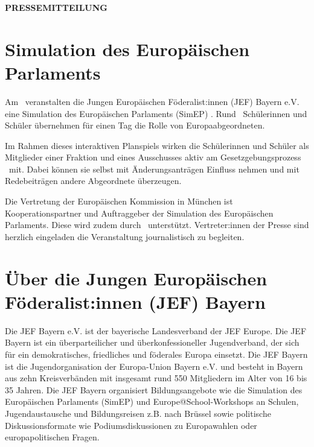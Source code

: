 \documentclass[11pt]{article}
\begin{document}
\thispagestyle{empty}

\begin{center}
    \textbf{\Large PRESSEMITTEILUNG}
\end{center}

\vspace{0.5cm}

\section*{Simulation des Europäischen Parlaments \location}

Am \datum\ veranstalten die Jungen Europäischen Föderalist:innen (JEF) Bayern e.V. eine Simulation des Europäischen Parlaments (SimEP) \location. Rund \numSuS\ Schülerinnen und Schüler übernehmen für einen Tag die Rolle von Europaabgeordneten.

Im Rahmen dieses interaktiven Planspiels wirken die Schülerinnen und Schüler als Mitglieder einer Fraktion und eines Ausschusses aktiv am Gesetzgebungsprozess \theme\ mit. Dabei können sie selbst mit Änderungsanträgen Einfluss nehmen und mit Redebeiträgen andere Abgeordnete überzeugen. 

Die Vertretung der Europäischen Kommission in München ist Kooperationspartner und Auftraggeber der Simulation des Europäischen Parlaments.
\iflocalSupportPresent Diese wird zudem durch \localSupport\ unterstützt.\fi
Vertreter:innen der Presse sind herzlich eingeladen die Veranstaltung journalistisch zu begleiten.

\section*{Über die Jungen Europäischen Föderalist:innen (JEF) Bayern}

Die JEF Bayern e.V. ist der bayerische Landesverband der JEF Europe. Die JEF Bayern ist ein überparteilicher und überkonfessioneller Jugendverband, der sich für ein demokratisches, friedliches und föderales Europa einsetzt. Die JEF Bayern ist die Jugendorganisation der Europa-Union Bayern e.V. und besteht in Bayern aus zehn Kreisverbänden mit insgesamt rund 550 Mitgliedern im Alter von 16 bis 35 Jahren. Die JEF Bayern organisiert Bildungsangebote wie die Simulation des Europäischen Parlaments (SimEP) und Europe@School-Workshops an Schulen, Jugendaustausche und Bildungsreisen z.B. nach Brüssel sowie politische Diskussionsformate wie Podiumsdiskussionen zu Europawahlen oder europapolitischen Fragen.

\vfill

\PlaceLogosOne

\vspace{1cm}

\end{document}
